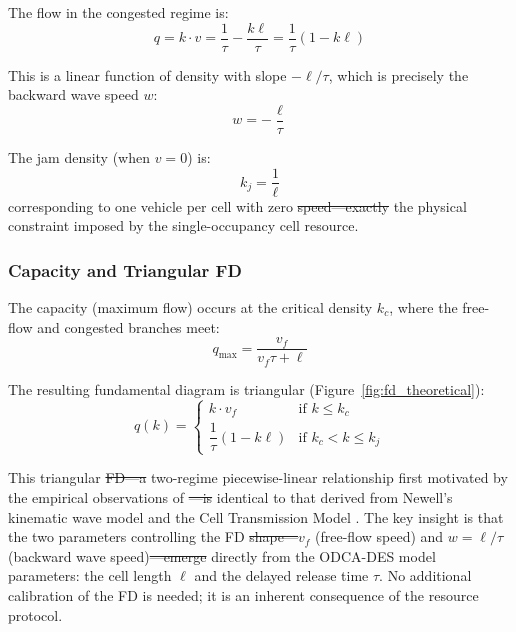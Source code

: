 \documentclass[review,authoryear]{elsarticle}
\providecommand{\DIFaddtex}[1]{{\protect\color{blue}\uwave{#1}}} %
\providecommand{\DIFdeltex}[1]{{\protect\color{red}\sout{#1}}}                      %
\providecommand{\DIFaddbegin}{} %
\providecommand{\DIFaddend}{} %
\providecommand{\DIFdelbegin}{} %
\providecommand{\DIFdelend}{} %
\providecommand{\DIFadd}[1]{\texorpdfstring{\DIFaddtex{#1}}{#1}} %
\providecommand{\DIFdel}[1]{\texorpdfstring{\DIFdeltex{#1}}{}} %
\newcommand{\DIFscaledelfig}{0.5}
\newlength{\DIFdelgraphicswidth} %
\newlength{\DIFdelgraphicsheight} %
\newcommand{\DIFaddincludegraphics}[2][]{{\color{blue}\fbox{\DIFOincludegraphics[#1]{#2}}}} %
\newcommand{\DIFdelincludegraphics}[2][]{%
\sbox{\DIFdelgraphicsbox}{\DIFOincludegraphics[#1]{#2}}%
\settoboxwidth{\DIFdelgraphicswidth}{\DIFdelgraphicsbox} %
\settoboxtotalheight{\DIFdelgraphicsheight}{\DIFdelgraphicsbox} %
\scalebox{\DIFscaledelfig}{%
\parbox[b]{\DIFdelgraphicswidth}{\usebox{\DIFdelgraphicsbox}\\[-\baselineskip] \rule{\DIFdelgraphicswidth}{0em}}\llap{\resizebox{\DIFdelgraphicswidth}{\DIFdelgraphicsheight}{%
\setlength{\unitlength}{\DIFdelgraphicswidth}%
\begin{picture}(1,1)%
\thicklines\linethickness{2pt} %
{\color[rgb]{1,0,0}\put(0,0){\framebox(1,1){}}}%
{\color[rgb]{1,0,0}\put(0,0){\line( 1,1){1}}}%
{\color[rgb]{1,0,0}\put(0,1){\line(1,-1){1}}}%
\end{picture}%
}\hspace*{3pt}}} %
} %
\DeclareRobustCommand{\DIFaddbegin}{\DIFOaddbegin \let\includegraphics\DIFaddincludegraphics} %
\DeclareRobustCommand{\DIFaddend}{\DIFOaddend \let\includegraphics\DIFOincludegraphics} %
\DeclareRobustCommand{\DIFdelbegin}{\DIFOdelbegin \let\includegraphics\DIFdelincludegraphics} %
\DeclareRobustCommand{\DIFdelend}{\DIFOaddend \let\includegraphics\DIFOincludegraphics} %
\begin{document}
The flow in the congested regime is:
\begin{equation}
    q = k \cdot v = \frac{1}{\tau} - \frac{k\ell}{\tau} = \frac{1}{\tau}\left(1 - k\ell\right)
    \label{eq:flow_congested}
\end{equation}

This is a linear function of density with slope $-\ell/\tau$, which is precisely the backward wave speed $w$:
\begin{equation}
    w = -\frac{\ell}{\tau}
    \label{eq:wave_speed}
\end{equation}

The jam density (when $v = 0$) is:
\begin{equation}
    k_j = \frac{1}{\ell}
    \label{eq:jam_density}
\end{equation}
corresponding to one vehicle per cell with zero \DIFdelbegin \DIFdel{speed---exactly }\DIFdelend \DIFaddbegin \DIFadd{speed, exactly }\DIFaddend the physical constraint imposed by the single-occupancy cell resource.

\subsubsection{Capacity and Triangular FD}

The capacity (maximum flow) occurs at the critical density $k_c$, where the free-flow and congested branches meet:
\begin{equation}
    q_{\max} = \frac{v_f}{v_f \tau + \ell}
    \label{eq:capacity}
\end{equation}

The resulting fundamental diagram is triangular (Figure~\ref{fig:fd_theoretical}):
\begin{equation}
    q(k) = \begin{cases}
        k \cdot v_f & \text{if } k \leq k_c \\[4pt]
        \dfrac{1}{\tau}(1 - k\ell) & \text{if } k_c < k \leq k_j
    \end{cases}
    \label{eq:triangular_fd}
\end{equation}

This triangular \DIFdelbegin \DIFdel{FD---a }\DIFdelend \DIFaddbegin \DIFadd{FD, a }\DIFaddend two-regime piecewise-linear relationship first motivated by the empirical observations of \citet{greenshields1935study}\DIFdelbegin \DIFdel{---is }\DIFdelend \DIFaddbegin \DIFadd{, is }\DIFaddend identical to that derived from Newell's kinematic wave model \citep{newell1993simplified} and the Cell Transmission Model \citep{daganzo1994cell}. The key insight is that the two parameters controlling the FD \DIFdelbegin \DIFdel{shape---}\DIFdelend \DIFaddbegin \DIFadd{shape, }\DIFaddend $v_f$ (free-flow speed) and $w = \ell/\tau$ (backward wave speed)\DIFdelbegin \DIFdel{---emerge }\DIFdelend \DIFaddbegin \DIFadd{, emerge }\DIFaddend directly from the ODCA-DES model parameters: the cell length $\ell$ and the delayed release time $\tau$. No additional calibration of the FD is needed; it is an inherent consequence of the resource protocol.
\end{document}
